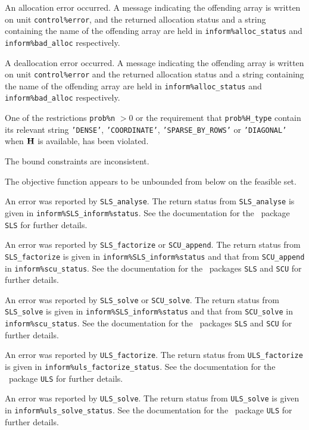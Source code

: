 \documentclass{galahad}
\begin{document}
\begin{description}

 An allocation error occurred. A message indicating
the offending
array is written on unit {\tt control\%error}, and the returned allocation
status and a string containing the name of the offending array
are held in {\tt inform\%alloc\_\-status}
and {\tt inform\%bad\_alloc} respectively.

 A deallocation error occurred.
A message indicating the offending
array is written on unit {\tt control\%error} and the returned allocation
status and a string containing the name of the offending array
are held in {\tt inform\%alloc\_\-status}
and {\tt inform\%bad\_alloc} respectively.

 One of the restrictions
 {\tt prob\%n} $> 0$
    or the requirement that
    {\tt prob\%H\_type} contain its relevant string
    {\tt 'DENSE'}, {\tt 'COORDINATE'}, {\tt 'SPARSE\_BY\_ROWS'}
    or {\tt 'DIAGONAL'} when ${\mathbf{H}}$ is available,
    has been violated.


 The bound constraints are inconsistent.

 The objective function appears to be unbounded
  from below on the feasible set.

 An error was reported by {\tt SLS\_analyse}. The return
status from {\tt SLS\_\-analyse} is given in
{\tt inform\%SLS\_inform\%\-status}.
See the documentation for the \galahad\ package {\tt SLS} for further details.

 An error was reported by {\tt SLS\_factorize} or
{\tt SCU\_append}.
The return status from {\tt SLS\_factorize} is given in
{\tt inform\%SLS\_inform\%status}
and that from {\tt SCU\_append} in {\tt inform\%scu\_status}.
See the documentation for the \galahad\ packages {\tt SLS} and {\tt SCU}
for further details.

 An error was reported by {\tt SLS\_solve} or
{\tt SCU\_solve}. The return
status from {\tt SLS\_solve} is given in {\tt inform\%SLS\_\-inform\%status}
and that from {\tt SCU\_solve} in {\tt inform\%scu\_status}.
See the documentation for the \galahad\ packages {\tt SLS} and {\tt SCU}
for further details.

 An error was reported by {\tt ULS\_factorize}.
The return status from {\tt ULS\_factorize} is given in
{\tt inform\%uls\_\-factorize\_\-status}.
See the documentation for the \galahad\ package {\tt ULS} for further details.

 An error was reported by {\tt ULS\_solve}. The return
status from {\tt ULS\_solve} is given in {\tt inform\%uls\_solve\_status}.
See the documentation for the \galahad\ package {\tt ULS} for further details.

\end{description}
\end{document}
